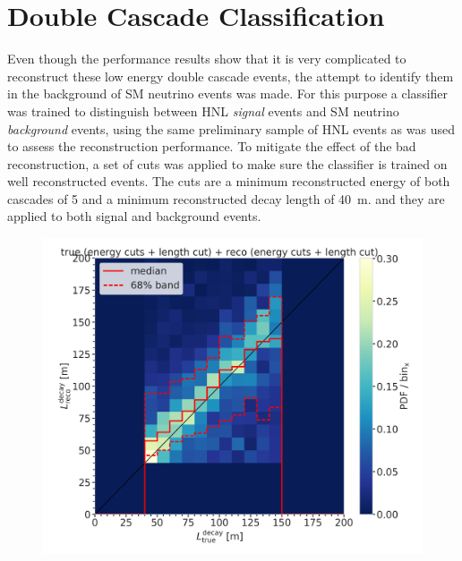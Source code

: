 

\section{Double Cascade Classification}

Even though the performance results show that it is very complicated to reconstruct these low energy double cascade events, the attempt to identify them in the background of SM neutrino events was made. For this purpose a classifier was trained to distinguish between HNL \textit{signal} events and SM neutrino \textit{background} events, using the same preliminary sample of HNL events as was used to assess the reconstruction performance. To mitigate the effect of the bad reconstruction, a set of cuts was applied to make sure the classifier is trained on well reconstructed events. The cuts are a minimum reconstructed energy of both cascades of \SI{5}{\gev} and a minimum reconstructed decay length of \SI{40}{\meter}. and they are applied to both signal and background events.

\begin{figure}[h]
    \centering
    \includegraphics{figures/results/190607/classification/reco_decayL_vs_true_decayL_reco_energy_cut_and_reco_length_cut_and_true_energy_cut_and_true_length_cut_step_contours_weighted.png}
    \caption[]{}
\end{figure}

